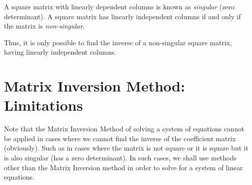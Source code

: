 A square matrix with linearly dependent columns is known as \textit{singular} (zero determinant). A square matrix has linearly independent columns if and only if the matrix is \textit{non-singular}.

\para

Thus, it is only possible to find the inverse of a non-singular square matrix, having linearly independent columns.

\para

\section{Matrix Inversion Method: Limitations}

Note that the Matrix Inversion Method of solving a system of equations cannot be applied in cases where we cannot find the inverse of the coefficient matrix (obviously). Such as in cases where the matrix is not square or it is square but it is also singular (has a zero determinant). In such cases, we shall use methods other than the Matrix Inversion method in order to solve for a system of linear equations.
